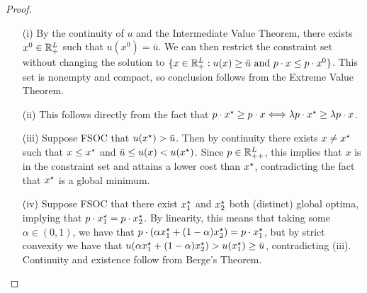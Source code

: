 \documentclass[12pt]{article}
\begin{document}
\begin{proof}
	
	\begin{itemize}
		\item[(i)] By the continuity of $u$ and the Intermediate Value Theorem, there exists $x^0 \in \mathbb{R}^L_+$ such that $u(x^0) = \bar{u}$. We can then restrict the constraint set without changing the solution to $\{x \in \mathbb{R}^L_+ : u(x) \ge \bar{u} \text{ and } p \cdot x \le p \cdot x^0\}$. This set is nonempty and compact, so conclusion follows from the Extreme Value Theorem.
		\item[(ii)] This follows directly from the fact that $p \cdot x^\star \ge p \cdot x \Longleftrightarrow \lambda p \cdot x^\star \ge \lambda p \cdot x$.
		\item[(iii)] Suppose FSOC that $u(x^\star) > \bar{u}$. Then by continuity there exists $x \ne x^\star$ such that $x \le x^\star$ and $\bar{u} \le u(x) < u(x^\star)$. Since $p \in \mathbb{R}^L_{++}$, this implies that $x$ is in the constraint set and attains a lower cost than $x^\star$, contradicting the fact that $x^\star$ is a global minimum.
		\item[(iv)] Suppose FSOC that there exist $x^\star_1$ and $x^\star_2$ both (distinct) global optima, implying that $p \cdot x^\star_1 = p \cdot x^\star_2$. By linearity, this means that taking some $\alpha \in (0,1)$, we have that $p \cdot (\alpha x^\star_1 + (1-\alpha)x^\star_2) = p\cdot x^\star_1$, but by strict convexity we have that $u(\alpha x^\star_1 + (1-\alpha)x^\star_2) > u(x^\star_1) \ge \bar{u}$, contradicting (iii). Continuity and existence follow from Berge's Theorem.
	\end{itemize}
\end{proof}
\end{document}
